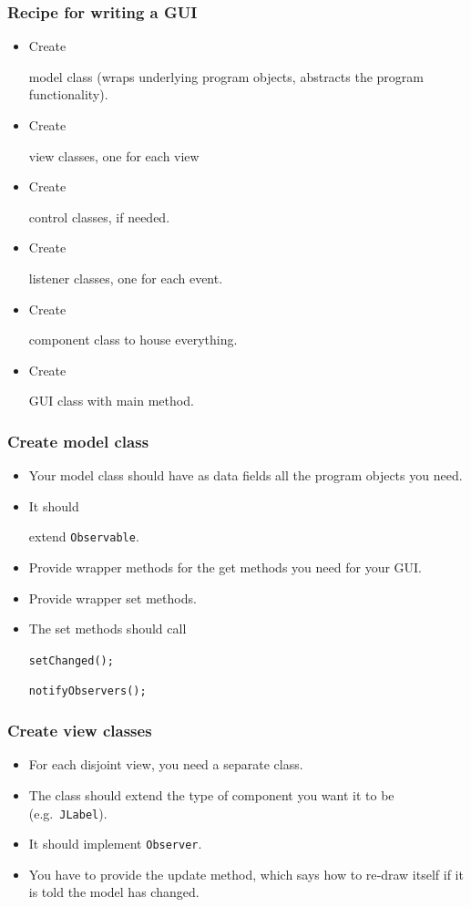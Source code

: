 \documentclass{beamer}
\def\mcolor#1#2{\rule{0ex}{0ex}\color{#1}#2\color{black}{}}
\begin{document}
\begin{frame}
\frametitle{Recipe for writing a GUI}
\begin{itemize}
\item Create \mcolor{blue}{model} class (wraps underlying program objects, abstracts the program functionality).
\item Create \mcolor{blue}{view} classes, one for each view
\item Create \mcolor{blue}{control} classes, if needed.
\item Create \mcolor{blue}{listener} classes, one for each event.
\item Create \mcolor{blue}{component} class to house everything.
\item Create \mcolor{blue}{GUI} class with main method. 
\end{itemize}
\end{frame}


\begin{frame}
  \frametitle{Create model class}
\begin{itemize}
\item Your model class should have as data fields all the program
  objects you need.
\item It should \mcolor{blue}{extend \texttt{Observable}}.
\item Provide wrapper methods for the get methods you need for your
  GUI.
\item Provide wrapper set methods.
\item The set methods should call\\
\mcolor{blue}{\texttt{setChanged();}}\\
\mcolor{blue}{\texttt{notifyObservers();}}
\end{itemize}
\end{frame}


\begin{frame}
\frametitle{Create view classes}
\begin{itemize}
\item For each disjoint view, you need a separate class.
\item The class should extend the type of component you want it to be
  (e.g.\ \texttt{JLabel}).
\item It should implement \texttt{Observer}.
\item \mcolor{blue}{You have to provide the update method, which says how to
  re‐draw itself if it is told the model has changed.}
\end{itemize}
\end{frame}
\end{document}
